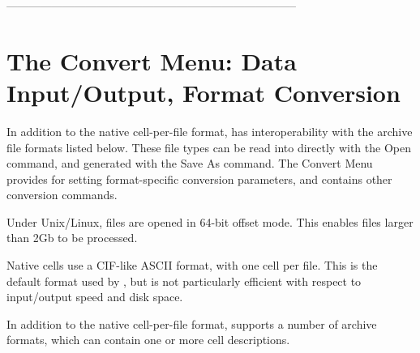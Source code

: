  -----------------------------------------------------------------------------

\chapter{The Convert Menu:  Data Input/Output, Format Conversion}
In addition to the native cell-per-file format, {\Xic} has
interoperability with the archive file formats listed below.  These
file types can be read into {\Xic} directly with the {\cb Open}
command, and generated with the {\cb Save As} command.  The {\cb
Convert Menu} provides for setting format-specific conversion
parameters, and contains other conversion commands.

Under Unix/Linux, files are opened in 64-bit offset mode.  This
enables files larger than 2Gb to be processed.

Native {\Xic} cells use a CIF-like ASCII format, with one cell per
file.  This is the default format used by {\Xic}, but is not
particularly efficient with respect to input/output speed and disk
space.

In addition to the native cell-per-file format, {\Xic} supports a
number of archive formats, which can contain one or more cell
descriptions.


